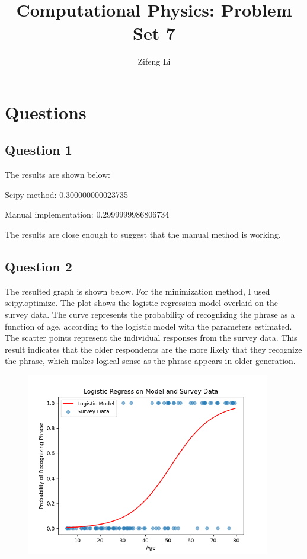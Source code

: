 \documentclass[11pt]{article}
\title{Computational Physics: Problem Set 7}
\author{Zifeng Li}
\begin{document}
\maketitle

\section{Questions}

\subsection{Question 1}
The results are shown below:

Scipy method:  0.300000000023735

Manual implementation:  0.2999999986806734

The results are close enough to suggest that the manual method is working.

\subsection{Question 2}
The resulted graph is shown below. For the minimization method, I used scipy.optimize.
The plot shows the logistic regression model overlaid on the survey data. The curve represents the probability of recognizing the phrase as a function of age, according to the logistic model with the parameters estimated. The scatter points represent the individual responses from the survey data.
This result indicates that the older respondents are the more likely that they recognize the phrase, which makes logical sense as the phrase appears in older generation.

\begin{figure}[b!]
\centering
\includegraphics[width=0.95\textwidth]{Logistic Regression Model and Survey Data.png}
\end{figure}
\end{document}
